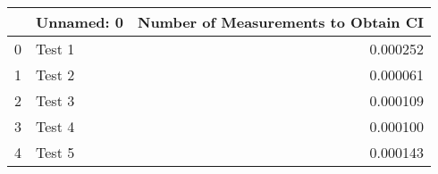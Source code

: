 \begin{tabular}{llr}
\toprule
{} & Unnamed: 0 &  Number of Measurements to Obtain CI \\
\midrule
0 &     Test 1 &                             0.000252 \\
1 &     Test 2 &                             0.000061 \\
2 &     Test 3 &                             0.000109 \\
3 &     Test 4 &                             0.000100 \\
4 &     Test 5 &                             0.000143 \\
\bottomrule
\end{tabular}
